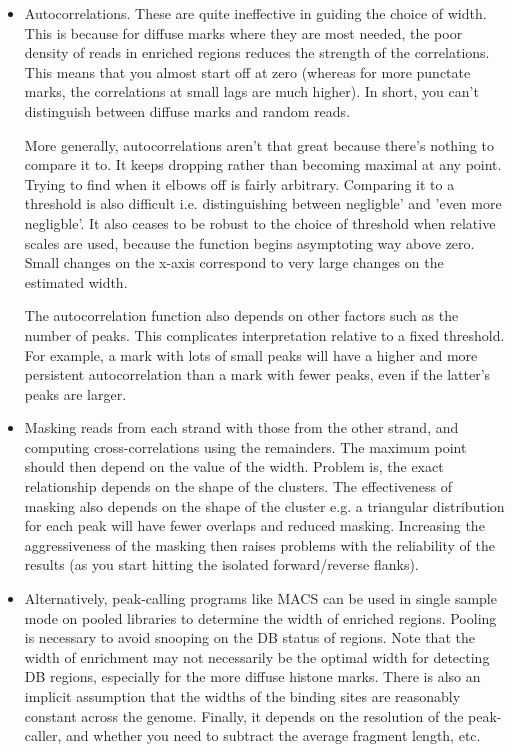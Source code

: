 \documentclass[12pt]{report}
\begin{document}
\begin{itemize}
\item Autocorrelations. 
These are quite ineffective in guiding the choice of width. 
This is because for diffuse marks where they are most needed, the poor density of reads in enriched regions reduces the strength of the correlations. 
This means that you almost start off at zero (whereas for more punctate marks, the correlations at small lags are much higher). 
In short, you can't distinguish between diffuse marks and random reads. 

More generally, autocorrelations aren't that great because there's nothing to compare it to. 
It keeps dropping rather than becoming maximal at any point. 
Trying to find when it elbows off is fairly arbitrary. 
Comparing it to a threshold is also difficult i.e. distinguishing between negligble' and 'even more negligble'. 
It also ceases to be robust to the choice of threshold when relative scales are used, because the function begins asymptoting way above zero.
Small changes on the x-axis correspond to very large changes on the estimated width.

The autocorrelation function also depends on other factors such as the number of peaks.
This complicates interpretation relative to a fixed threshold.  
For example, a mark with lots of small peaks will have a higher and more persistent autocorrelation than a mark with fewer peaks, even if the latter's peaks are larger. 

\item Masking reads from each strand with those from the other strand, and computing cross-correlations using the remainders. 
The maximum point should then depend on the value of the width. 
Problem is, the exact relationship depends on the shape of the clusters. 
The effectiveness of masking also depends on the shape of the cluster e.g. a triangular distribution for each peak will have fewer overlaps and reduced masking. 
Increasing the aggressiveness of the masking then raises problems with the reliability of the results (as you start hitting the isolated forward/reverse flanks).

\item Alternatively, peak-calling programs like MACS can be used in single sample mode on pooled libraries to determine the width of enriched regions.
Pooling is necessary to avoid snooping on the DB status of regions.
Note that the width of enrichment may not necessarily be the optimal width for detecting DB regions, especially for the more diffuse histone marks.
There is also an implicit assumption that the widths of the binding sites are reasonably constant across the genome. 
Finally, it depends on the resolution of the peak-caller, and whether you need to subtract the average fragment length, etc.
\end{itemize}
\end{document}

